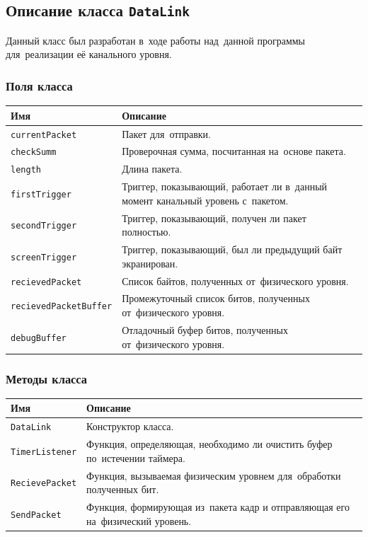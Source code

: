 \documentclass[a4paper,12pt]{article}
\begin{document}
\subsection{Описание класса \texttt{DataLink}}
Данный класс был разработан в~ходе работы над~данной программы для~реализации её канального уровня.

\subsubsection*{Поля класса}
\begin{center}
\begin{longtabu} to \linewidth {|X|X[2.6]|}
\hline
\textbf{Имя}	&	\textbf{Описание}\\\hline\endhead
\texttt{currentPacket}	&	Пакет для~отправки.\\\hline
\texttt{checkSumm}	&	Проверочная сумма, посчитанная на~основе пакета.\\\hline
\texttt{length}	&	Длина пакета.\\\hline
\texttt{firstTrigger}	&	Триггер, показывающий, работает ли в~данный момент канальный уровень с~пакетом.\\\hline
\texttt{secondTrigger}	&	Триггер, показывающий, получен ли пакет полностью.\\\hline
\texttt{screenTrigger}	&	Триггер, показывающий, был ли предыдущий байт экранирован.\\\hline
\texttt{recievedPacket}	&	Список байтов, полученных от~физического уровня.\\\hline
\texttt{recievedPacketBuffer}	&	Промежуточный список битов, полученных от~физического уровня.\\\hline
\texttt{debugBuffer}	&	Отладочный буфер битов, полученных от~физического уровня.\\\hline
\end{longtabu}
\end{center}

\subsubsection*{Методы класса}
\begin{center}
\begin{longtabu} to \linewidth {|X|X[2.6]|}
\hline
\textbf{Имя}	&	\textbf{Описание}\\\hline\endhead
\texttt{DataLink}	&	Конструктор класса.\\\hline
\texttt{TimerListener}	&	Функция, определяющая, необходимо ли очистить буфер по~истечении таймера.\\\hline
\texttt{RecievePacket}	&	Функция, вызываемая физическим уровнем для~обработки полученных бит.\\\hline
\texttt{SendPacket}	&	Функция, формирующая из~пакета кадр и отправляющая его на~физический уровень.\\\hline
\end{longtabu}
\end{center}
\end{document}
